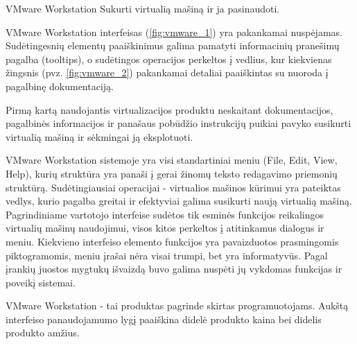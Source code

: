 \begin{xcase}{VMware Workstation}
  \xcgoal
  {
    Sukurti virtualią mašiną ir ja pasinaudoti.
  }
  
  \xctools
  {
    VMware Workstation interfeisas (\ref{fig:vmware_1}) yra pakankamai nuspėjamas. Sudėtingesnių elementų 
    paaiškinimus galima pamatyti informacinių pranešimų pagalba (tooltips), o sudėtingos
    operacijos perkeltos į vedlius, kur kiekvienas žingsnis (pvz. \ref{fig:vmware_2}) pakankamai detaliai 
    paaiškintas su nuoroda į pagalbinę dokumentaciją.
  }
  
  \xcresult
  {
    Pirmą kartą naudojantis virtualizacijos produktu neskaitant dokumentacijos, pagalbinės
    informacijos ir panašaus pobūdžio instrukcijų puikiai pavyko susikurti virtualią mašiną
    ir sėkmingai ją eksplotuoti.
  }
  
  \xcprinciples
  {
    {
      VMware Workstation sistemoje yra visi standartiniai meniu (File, Edit, View, Help), kurių
      struktūra yra panaši į gerai žinomų teksto redagavimo priemonių struktūrą.
    }
    {
      Sudėtingiausiai operacijai - virtualios mašinos kūrimui yra pateiktas vedlys, kurio
      pagalba greitai ir efektyviai galima susikurti naują virtualią mašiną.
    }
    {
      Pagrindiniame vartotojo interfeise sudėtos tik esminės funkcijos reikalingos virtualių
      mašinų naudojimui, visos kitos perkeltos į atitinkamus dialogus ir meniu.
    }
    {
      Kiekvieno interfeiso elemento funkcijos yra pavaizduotos prasmingomis piktogramomis, meniu
      įrašai nėra visai trumpi, bet yra informatyvūs.
    }
    {
      Pagal įrankių juostos mygtukų išvaizdą buvo galima nuspėti jų vykdomas funkcijas ir 
      poveikį sistemai.
    }
  }
  
  \xcthoughts
  {
    VMware Workstation - tai produktas pagrinde skirtas programuotojams. Aukštą interfeiso
    panaudojamumo lygį paaiškina didelė produkto kaina bei didelis produkto amžius.
  }
\end{xcase}
